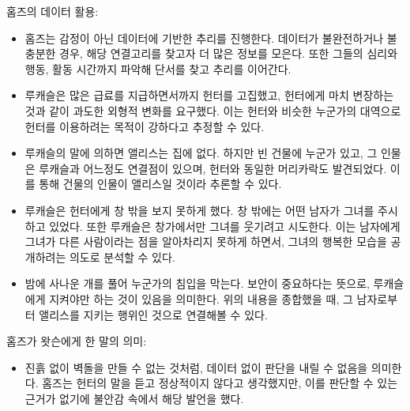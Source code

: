 	홈즈의 데이터 활용:
	\begin{itemize}
		\item 홈즈는 감정이 아닌 데이터에 기반한 추리를 진행한다. 데이터가 불완전하거나 불충분한 경우, 해당 연결고리를 찾고자 더 많은 정보를 모은다. 또한 그들의 심리와 행동, 활동 시간까지 파악해 단서를 찾고 추리를 이어간다.
		\item 루캐슬은 많은 급료를 지급하면서까지 헌터를 고집했고, 헌터에게 마치 변장하는 것과 같이 과도한 외형적 변화를 요구했다. 이는 헌터와 비슷한 누군가의 대역으로 헌터를 이용하려는 목적이 강하다고 추정할 수 있다.
		\item 루캐슬의 말에 의하면 앨리스는 집에 없다. 하지만 빈 건물에 누군가 있고, 그 인물은 루캐슬과 어느정도 연결점이 있으며, 헌터와 동일한 머리카락도 발견되었다. 이를 통해 건물의 인물이 앨리스일 것이라 추론할 수 있다.
		\item 루캐슬은 헌터에게 창 밖을 보지 못하게 했다. 창 밖에는 어떤 남자가 그녀를 주시하고 있었다. 또한 루캐슬은 창가에서만 그녀를 웃기려고 시도한다. 이는 남자에게 그녀가 다른 사람이라는 점을 알아차리지 못하게 하면서, 그녀의 행복한 모습을 공개하려는 의도로 분석할 수 있다.
		\item 밤에 사나운 개를 풀어 누군가의  침입을 막는다. 보안이 중요하다는 뜻으로, 루캐슬에게 지켜야만 하는 것이 있음을 의미한다. 위의 내용을 종합했을 때, 그 남자로부터 앨리스를 지키는 행위인 것으로 연결해볼 수 있다.
	\end{itemize}
	홈즈가 왓슨에게 한 말의 의미:
	\begin{itemize}
		\item 진흙 없이 벽돌을 만들 수 없는 것처럼, 데이터 없이 판단을 내릴 수 없음을 의미한다. 홈즈는 헌터의 말을 듣고 정상적이지 않다고 생각했지만, 이를 판단할 수 있는 근거가 없기에 불안감 속에서 해당 발언을 했다.
	\end{itemize}